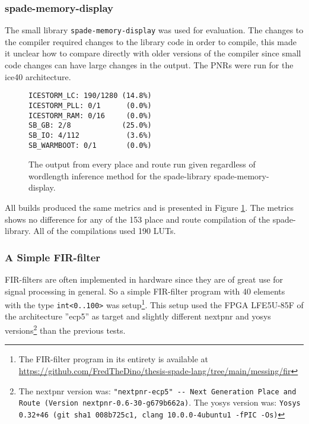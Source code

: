 \subsubsection{spade-memory-display}
The small library \verb+spade-memory-display+ was used for evaluation. The changes to the compiler required changes to the library code in order to compile, this made it unclear how to compare directly with older versions of the compiler since small code changes can have large changes in the output. The PNRs were run for the ice40 architecture.
 
\begin{figure}[h!]
\begin{center}
\begin{verbatim}
ICESTORM_LC: 190/1280 (14.8%)
ICESTORM_PLL: 0/1      (0.0%)
ICESTORM_RAM: 0/16     (0.0%)
SB_GB: 2/8            (25.0%)
SB_IO: 4/112           (3.6%)
SB_WARMBOOT: 0/1       (0.0%)
\end{verbatim}
\end{center}

  \caption{The output from every place and route run given regardless of wordlength inference method for the spade-library spade-memory-display.}
  \label{fig:SMDoutput}
\end{figure}

All builds produced the same metrics and is presented in Figure \ref{fig:SMDoutput}. The metrics shows no difference for any of the 153 place and route compilation of the spade-library. All of the compilations used 190 LUTs. 

\subsubsection{A Simple FIR-filter}
FIR-filters are often implemented in hardware since they are of great use for signal processing in general. So a simple FIR-filter program with 40 elements with the type \verb+int<0..100>+ was setup\cprotect\footnote{The FIR-filter program in its entirety is available at \href{https://github.com/FredTheDino/thesis-spade-lang/tree/main/messing/fir}{https://github.com/FredTheDino/thesis-spade-lang/tree/main/messing/fir}}. This setup used the FPGA LFE5U-85F of the architecture ''ecp5'' as target and slightly different nextpnr and yosys versions\cprotect\footnote{The nextpnr version was: \verb+"nextpnr-ecp5" -- Next Generation Place and Route (Version nextpnr-0.6-30-g679b662a)+. The yosys version was: \verb!Yosys 0.32+46 (git sha1 008b725c1, clang 10.0.0-4ubuntu1 -fPIC -Os)!} than the previous tests.


